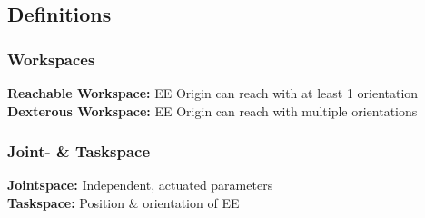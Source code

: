 \subsection{Definitions}
    \subsubsection{Workspaces}
        \textbf{Reachable Workspace:} EE Origin can reach with at least 1 orientation\\
        \textbf{Dexterous Workspace:} EE Origin can reach with multiple orientations
    \subsubsection{Joint- \& Taskspace}
        \textbf{Jointspace:} Independent, actuated parameters\\
        \textbf{Taskspace:} Position \& orientation of EE

